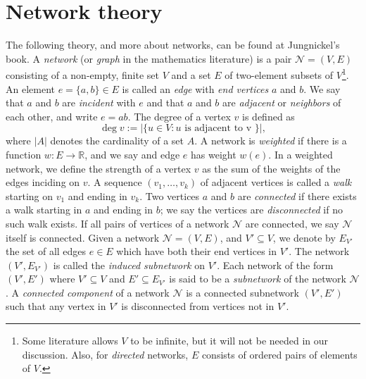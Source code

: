 \documentclass[letterpaper, 10 pt, conference]{article}
\newcommand\N{\ensuremath{\mathcal{N}}}
\begin{document}
\section{Network theory} \label{appendix}
 The following theory, and more about networks, can be found at Jungnickel's book\cite{jungnickel}. A \textit{network} (or \textit{graph} in the mathematics literature) is a pair $\N = (V, E)$ consisting of a non-empty, finite set $V$ and a set $E$ of two-element subsets of $V$\footnote{Some literature allows $V$ to be infinite, but it will not be needed in our discussion. Also, for \textit{directed} networks, $E$ consists of ordered pairs of elements of $V$.}. An element $e = \lbrace a, b\rbrace \in E$ is called an \textit{edge} with \textit{end vertices} $a$ and $b$. We say that $a$ and $b$ are \textit{incident} with $e$ and that $a$ and $b$ are \textit{adjacent} or \textit{neighbors} of each other, and write $e = ab$. The degree of a vertex $v$ is defined as 
\begin{equation}
\deg v := | \lbrace u \in V : u \text{ is adjacent to v } \rbrace |,
\end{equation} 
where $|A|$ denotes the cardinality of a set $A$. A network is \textit{weighted} if there is a function $w: E \rightarrow \mathbb{R}$, and we say and edge $e$ has weight $w(e)$. In a weighted network, we define the strength of a vertex $v$ as the sum of the weights of the edges inciding on $v$. A sequence $(v_1, \dots, v_k)$ of adjacent vertices is called a \textit{walk} starting on $v_1$ and ending in $v_k$. Two vertices $a$ and $b$ are \textit{connected} if there exists a walk starting in $a$ and ending in $b$; we say the vertices are \textit{disconnected} if no such walk exists. If all pairs of vertices of a network $\N$ are connected, we say $\N$ itself is connected.
Given a network $\N = (V, E)$, and $V'  \subseteq V$, we denote by $E_{V'}$ the set of all edges $e \in E$ which have both their end vertices in $V'$. The network $(V', E_{V'})$ is called the \textit{induced subnetwork} on $V'$. Each network of the form $(V', E')$ where $V' \subseteq V$ and $E' \subseteq E_{V'}$ is said to be a \textit{subnetwork} of the network $\N$. A \textit{connected component} of a network $\N$ is a connected subnetwork $(V', E')$ such that any vertex in $V'$ is disconnected from vertices not in $V'$.






\end{document}
